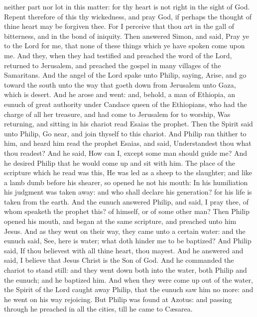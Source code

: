 neither part nor lot in this matter: for thy heart is not right in the
sight of God.  Repent therefore of this thy wickedness,
and pray God, if perhaps the thought of thine heart may be forgiven
thee.  For I perceive that thou art in the gall of
bitterness, and in the bond of iniquity.  Then answered
Simon, and said, Pray ye to the Lord for me, that none of these things
which ye have spoken come upon me.  And they, when they
had testified and preached the word of the Lord, returned to Jerusalem,
and preached the gospel in many villages of the Samaritans.
 And the angel of the Lord spake unto Philip, saying,
Arise, and go toward the south unto the way that goeth down from
Jerusalem unto Gaza, which is desert.  And he arose and
went: and, behold, a man of Ethiopia, an eunuch of great authority under
Candace queen of the Ethiopians, who had the charge of all her treasure,
and had come to Jerusalem for to worship,  Was returning,
and sitting in his chariot read Esaias the prophet.  Then
the Spirit said unto Philip, Go near, and join thyself to this chariot.
 And Philip ran thither to him, and heard him read the
prophet Esaias, and said, Understandest thou what thou readest?
 And he said, How can I, except some man should guide me?
And he desired Philip that he would come up and sit with him.
 The place of the scripture which he read was this, He
was led as a sheep to the slaughter; and like a lamb dumb before his
shearer, so opened he not his mouth:  In his humiliation
his judgment was taken away: and who shall declare his generation? for
his life is taken from the earth.  And the eunuch
answered Philip, and said, I pray thee, of whom speaketh the prophet
this? of himself, or of some other man?  Then Philip
opened his mouth, and began at the same scripture, and preached unto him
Jesus.  And as they went on their way, they came unto a
certain water: and the eunuch said, See, here is water; what doth hinder
me to be baptized?  And Philip said, If thou believest
with all thine heart, thou mayest. And he answered and said, I believe
that Jesus Christ is the Son of God.  And he commanded
the chariot to stand still: and they went down both into the water, both
Philip and the eunuch; and he baptized him.  And when
they were come up out of the water, the Spirit of the Lord caught away
Philip, that the eunuch saw him no more: and he went on his way
rejoicing.  But Philip was found at Azotus: and passing
through he preached in all the cities, till he came to Cæsarea.

